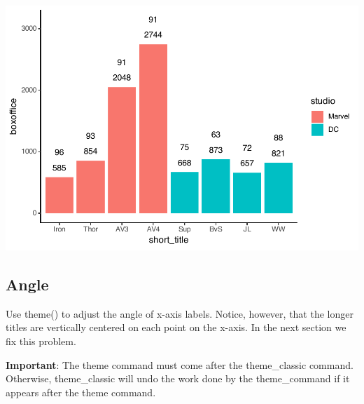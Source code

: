 \documentclass[
]{krantz}
\begin{document}
\includegraphics[width=0.65\linewidth]{bookdown_files/figure-latex/unnamed-chunk-121-1}

\hypertarget{angle}{%
\subsection{Angle}\label{angle}}

Use theme() to adjust the angle of x-axis labels. Notice, however, that the longer titles are vertically centered on each point on the x-axis. In the next section we fix this problem.

\textbf{Important}: The theme command must come after the theme\_classic command. Otherwise, theme\_classic will undo the work done by the theme\_command if it appears after the theme command.
\end{document}
